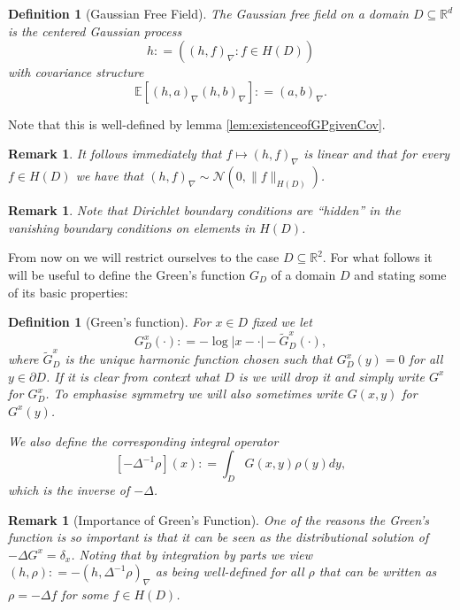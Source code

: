 \documentclass[11pt,reqno]{amsart}
\numberwithin{equation}{section}
\newtheorem{defi}[thm]{Definition}
\newtheorem{rem}[thm]{Remark}
\newcommand{\deq}{\mathrel{\mathop:}=}
\begin{document}
\begin{defi}[Gaussian Free Field]
	The Gaussian free field on a domain $D\subseteq\mathbb R^d$ is the centered Gaussian process $$h\deq ((h,f)_\nabla : f\in H(D))$$ with covariance structure $$\mathbb E[(h,a)_\nabla(h,b)_\nabla]\deq (a,b)_\nabla.$$
\end{defi}
Note that this is well-defined by lemma \ref{lem:existenceofGPgivenCov}.
\begin{rem}
	It follows immediately that $f\mapsto (h,f)_\nabla$ is linear and that for every $f\in H(D)$ we have that $(h,f)_\nabla\sim\mathcal N(0,\|f\|_{H(D)})$.
\end{rem}

\begin{rem}
	Note that Dirichlet boundary conditions are ``hidden'' in the vanishing boundary conditions on elements in $H(D)$. %
\end{rem}From now on we will restrict ourselves to the case $D\subseteq\mathbb R^2$. For what follows it will be useful to define the Green's function $G_D$ of a domain $D$ and stating some of its basic properties:

\begin{defi}[Green's function]
	For $x\in D$ fixed we let $$G_D^x(\cdot)\deq -\log|x-\cdot|-\tilde G_D^x(\cdot),$$ where $\tilde G_D^x$ is the unique harmonic function chosen such that $G_D^x(y)=0$ for all $y\in\partial D$.
	If it is clear from context what $D$ is we will drop it and simply write $G^x$ for $G^x_D$.
	To emphasise symmetry we will also sometimes write $G(x,y)$ for $G^x(y)$.
	
	We also define the corresponding integral operator $$[-\Delta^{-1}\rho](x)\deq\int_D G(x,y)\rho(y)dy,$$ which is the inverse of $-\Delta$.
\end{defi}

\begin{rem}[Importance of Green's Function]\label{rem:usesofGreensfct}
	One of the reasons the Green's function is so important is that it can be seen as the distributional solution of $-\Delta G^x = \delta_x$. 
	Noting that by integration by parts we view $(h,\rho)\deq -(h,\Delta^{-1}\rho)_\nabla$ as being well-defined for all $\rho$ that can be written as $\rho = -\Delta f$ for some $f\in H(D)$.
\end{rem}
\end{document}
